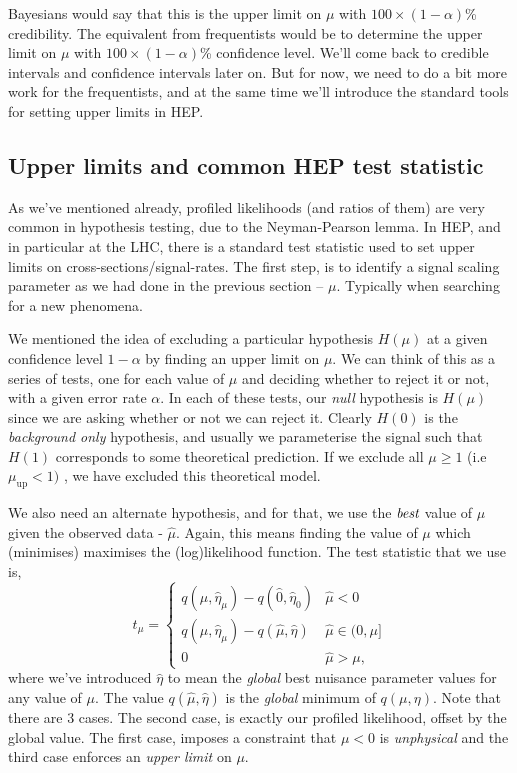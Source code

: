 Bayesians would say that this is the upper limit on $\mu$ with $100\times(1-\alpha)$\% credibility. The equivalent from frequentists would be to determine the upper limit on $\mu$ with $100\times(1-\alpha)$\% confidence level. We'll come back to credible intervals and confidence intervals later on. But for now, we need to do a bit more work for the frequentists, and at the same time we'll introduce the standard tools for setting upper limits in HEP. 

\subsection{Upper limits and common HEP test statistic}
As we've mentioned already, profiled likelihoods (and ratios of them) are very common in hypothesis testing, due to the Neyman-Pearson lemma. In HEP, and in particular at the LHC, there is a standard test statistic used to set upper limits on cross-sections/signal-rates. The first step, is to identify a signal scaling parameter as we had done in the previous section -- $\mu$. Typically when searching for a new phenomena. 

We mentioned the idea of excluding a particular hypothesis $H(\mu)$ at a given confidence level $1-\alpha$ by finding an upper limit on $\mu$. We can think of this as a series of tests, one for each value of $\mu$
and deciding whether to reject it or not, with a given error rate $\alpha$. In each of these tests, our \emph{null} hypothesis is $H(\mu)$ since we are asking whether or not we can reject it. Clearly $H(0)$ is the \emph{background only} hypothesis, and usually we parameterise the signal such that $H(1)$ corresponds to some theoretical prediction. If we exclude all $\mu\geq 1$ (i.e $\mu_{\mathrm{up}}<1)$ , we have excluded this theoretical model. 

We also need an alternate hypothesis, and for that, we use the $\emph{best}$ value of $\mu$ given the observed data - $\hat{\mu}$. Again, this means finding the value of $\mu$ which (minimises) maximises the (log)likelihood function. The test statistic that we use is,
\begin{equation}
    t_{\mu} = \begin{cases}
                q(\mu,\hat{\eta}_{\mu})-q(\hat{0},\hat{\eta}_{0})    & \hat{\mu} < 0 \\
                q(\mu,\hat{\eta}_{\mu})-q(\hat{\mu},\hat{\eta})    & \hat{\mu} \in (0,\mu] \\
                0               & \hat{\mu}>\mu,
                \end{cases}
\end{equation}
where we've introduced $\hat{\eta}$ to mean the \emph{global} best nuisance parameter values for any value of $\mu$. The value $q(\hat{\mu},\hat{\eta})$ is the \emph{global} minimum of $q(\mu,\eta)$. Note that there are 3 cases. The second case, is exactly our profiled likelihood, offset by the global value. The first case, imposes a constraint that $\mu<0$ is \emph{unphysical} and the third case enforces an \emph{upper limit} on $\mu$. 

